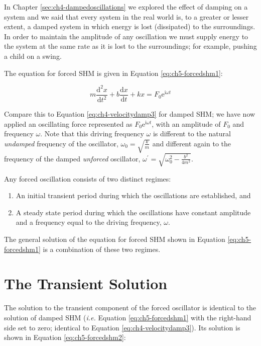 \documentclass[
]{book}
\providecommand{\tightlist}{%
  \setlength{\itemsep}{0pt}\setlength{\parskip}{0pt}}
\begin{document}
In Chapter \ref{sec:ch4-dampedoscillations} we explored the effect of damping on a system and we said that every system in the real world is, to a greater or lesser extent, a damped system in which energy is lost (dissipated) to the surroundings. In order to maintain the amplitude of any oscillation we must supply energy to the system at the same rate as it is lost to the surroundings; for example, pushing a child on a swing.

The equation for forced SHM is given in Equation \eqref{eq:ch5-forcedshm1}:

\begin{equation}
m \frac{\mathrm{d}^2 x}{\mathrm{d}t^2} + b \frac{\mathrm{d}x}{\mathrm{d}t}+ kx = F_0 \mathrm{e}^{\mathrm{i}\omega t}
\label{eq:ch5-forcedshm1}
\end{equation}

Compare this to Equation \eqref{eq:ch4-velocitydamp3} for damped SHM; we have now applied an oscillating force represented as \(F_0 \mathrm{e}^{\mathrm{i}\omega t}\), with an amplitude of \(F_0\) and frequency \(\omega\). Note that this driving frequency \(\omega\) is different to the natural \emph{undamped} frequency of the oscillator, \(\omega_0 = \sqrt{\frac{k}{m}}\) and different again to the frequency of the damped \emph{unforced} oscillator, \(\omega^\prime = \sqrt{\omega_0^2 - \frac{b^2}{4m^2}}\).

Any forced oscillation consists of two distinct regimes:

\begin{enumerate}
\def\labelenumi{\arabic{enumi}.}
\tightlist
\item
  An initial transient period during which the oscillations are established, and
\item
  A steady state period during which the oscillations have constant amplitude and a frequency equal to the driving frequency, \(\omega\).
\end{enumerate}

The general solution of the equation for forced SHM shown in Equation \eqref{eq:ch5-forcedshm1} is a combination of these two regimes.

\hypertarget{sec:ch5-transientsolution}{%
\section{The Transient Solution}\label{sec:ch5-transientsolution}}

The solution to the transient component of the forced oscillator is identical to the solution of damped SHM (\emph{i.e.} Equation \eqref{eq:ch5-forcedshm1} with the right-hand side set to zero; identical to Equation \eqref{eq:ch4-velocitydamp3}). Its solution is shown in Equation \eqref{eq:ch5-forcedshm2}:
\end{document}
